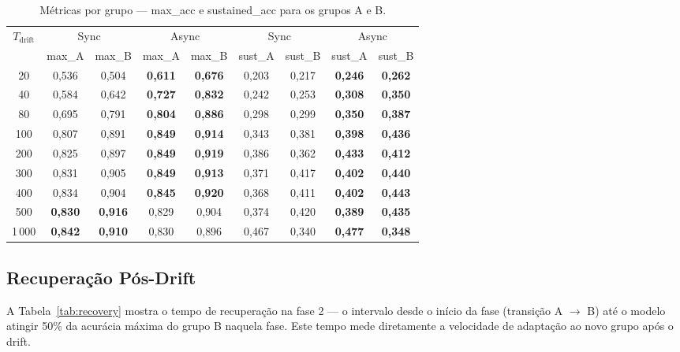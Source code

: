 \documentclass[12pt, a4paper]{article}
\begin{document}
\begin{table}[H]
\centering
\caption{Métricas por grupo --- max\_acc e sustained\_acc para os grupos A e B.}
\label{tab:per_group}
\renewcommand{\arraystretch}{1.15}
\footnotesize
\begin{tabular}{c|cccc|cccc}
\toprule
\multirow{2}{*}{$T_{\text{drift}}$} &
  \multicolumn{2}{c}{Sync} &
  \multicolumn{2}{c|}{Async} &
  \multicolumn{2}{c}{Sync} &
  \multicolumn{2}{c}{Async} \\
& max\_A & max\_B & max\_A & max\_B & sust\_A & sust\_B & sust\_A & sust\_B \\
\midrule
20   & 0{,}536 & 0{,}504 & \textbf{0{,}611} & \textbf{0{,}676} & 0{,}203 & 0{,}217 & \textbf{0{,}246} & \textbf{0{,}262} \\
40   & 0{,}584 & 0{,}642 & \textbf{0{,}727} & \textbf{0{,}832} & 0{,}242 & 0{,}253 & \textbf{0{,}308} & \textbf{0{,}350} \\
80   & 0{,}695 & 0{,}791 & \textbf{0{,}804} & \textbf{0{,}886} & 0{,}298 & 0{,}299 & \textbf{0{,}350} & \textbf{0{,}387} \\
100  & 0{,}807 & 0{,}891 & \textbf{0{,}849} & \textbf{0{,}914} & 0{,}343 & 0{,}381 & \textbf{0{,}398} & \textbf{0{,}436} \\
200  & 0{,}825 & 0{,}897 & \textbf{0{,}849} & \textbf{0{,}919} & 0{,}386 & 0{,}362 & \textbf{0{,}433} & \textbf{0{,}412} \\
300  & 0{,}831 & 0{,}905 & \textbf{0{,}849} & \textbf{0{,}913} & 0{,}371 & 0{,}417 & \textbf{0{,}402} & \textbf{0{,}440} \\
400  & 0{,}834 & 0{,}904 & \textbf{0{,}845} & \textbf{0{,}920} & 0{,}368 & 0{,}411 & \textbf{0{,}402} & \textbf{0{,}443} \\
500  & \textbf{0{,}830} & \textbf{0{,}916} & 0{,}829 & 0{,}904 & 0{,}374 & 0{,}420 & \textbf{0{,}389} & \textbf{0{,}435} \\
1\,000 & \textbf{0{,}842} & \textbf{0{,}910} & 0{,}830 & 0{,}896 & 0{,}467 & 0{,}340 & \textbf{0{,}477} & \textbf{0{,}348} \\
\bottomrule
\end{tabular}
\end{table}

\subsection{Recuperação Pós-Drift}

A Tabela~\ref{tab:recovery} mostra o tempo de recuperação na fase 2 --- o
intervalo desde o início da fase (transição A $\to$ B) até o modelo atingir
50\% da acurácia máxima do grupo B naquela fase. Este tempo mede diretamente
a velocidade de adaptação ao novo grupo após o drift.
\end{document}
